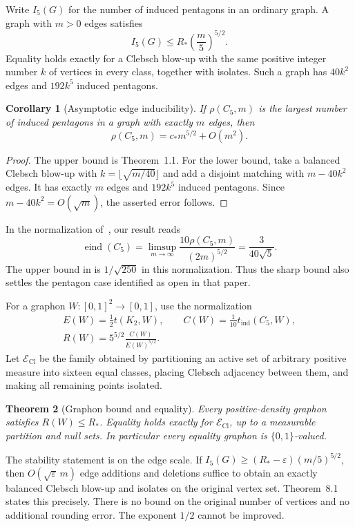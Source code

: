 \documentclass[11pt]{amsart}
\newtheorem{theorem}{Theorem}[section]
\newtheorem{corollary}[theorem]{Corollary}
\theoremstyle{definition}
\theoremstyle{remark}
\begin{document}
Write \(I_5(G)\) for the number of induced pentagons in an ordinary graph.
A graph with \(m>0\) edges satisfies
\[
 I_5(G)\le R_*\left(\frac m5\right)^{5/2}.
\]
Equality holds exactly for a Clebsch blow-up with the same positive integer
number \(k\) of vertices in every class, together with isolates. Such a
graph has \(40k^2\) edges and \(192k^5\) induced pentagons.

\begin{corollary}[Asymptotic edge inducibility]\label{cor:asymptotic}
If \(\rho(C_5,m)\) is the largest number of induced pentagons in a graph
with exactly \(m\) edges, then
\[
 \rho(C_5,m)=c_*m^{5/2}+O(m^2).
\]
\end{corollary}
\begin{proof}
The upper bound is Theorem~1.1. For the lower bound, take a balanced
Clebsch blow-up with \(k=\lfloor\sqrt{m/40}\rfloor\) and add a disjoint
matching with \(m-40k^2\) edges. It has exactly \(m\) edges and \(192k^5\)
induced pentagons. Since \(m-40k^2=O(\sqrt m)\), the asserted error follows.
\end{proof}

In the normalization of~\cite{Chao2025}, our result reads
\[
 \operatorname{eind}(C_5)
 =\limsup_{m\to\infty}\frac{10\rho(C_5,m)}{(2m)^{5/2}}
 =\frac{3}{40\sqrt5}.
\]
The upper bound in \cite[Theorem~1.8]{Chao2025} is \(1/\sqrt{250}\) in this
normalization. Thus the sharp bound also settles the pentagon case
identified as open in that paper.

For a graphon \(W:[0,1]^2\to[0,1]\), use the normalization
\[
 \begin{gathered}
 E(W)=\frac12t(K_2,W),\qquad
 C(W)=\frac1{10}t_{\mathrm{ind}}(C_5,W),\\
 R(W)=5^{5/2}\frac{C(W)}{E(W)^{5/2}}.
 \end{gathered}
\]
Let \(\mathcal E_{\mathrm{Cl}}\) be the family obtained by partitioning an
active set of arbitrary positive measure into sixteen equal classes,
placing Clebsch adjacency between them, and making all remaining points
isolated.

\begin{theorem}[Graphon bound and equality]\label{thm:graphon}
Every positive-density graphon satisfies \(R(W)\le R_*\).
Equality holds exactly for \(\mathcal E_{\mathrm{Cl}}\), up to a measurable
partition and null sets. In particular every equality graphon is
\(\{0,1\}\)-valued.
\end{theorem}

The stability statement is on the edge scale. If
\(I_5(G)\ge (R_*-\varepsilon)(m/5)^{5/2}\), then
\(O(\sqrt{\varepsilon}\,m)\) edge additions and deletions suffice to obtain
an exactly balanced Clebsch blow-up and isolates on the original vertex
set. Theorem~8.1 states this precisely. There is no bound on the original
number of vertices and no additional rounding error. The exponent \(1/2\)
cannot be improved.
\end{document}

